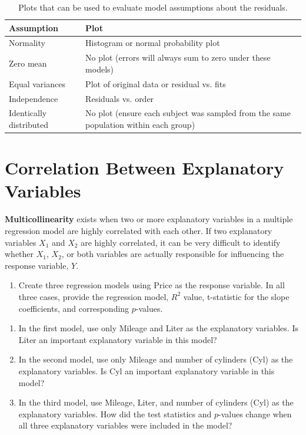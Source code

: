 \documentclass[
]{report}
\providecommand{\tightlist}{%
  \setlength{\itemsep}{0pt}\setlength{\parskip}{0pt}}
\begin{document}
\begin{table}[!h]
\centering
\caption{\label{tab:tab1}Plots that can be used to evaluate model assumptions about the residuals.}
\centering
\begin{tabular}[t]{ll}
\toprule
Assumption & Plot\\
\midrule
Normality & Histogram or normal probability plot\\
Zero mean & No plot (errors will always sum to zero under these models)\\
Equal variances & Plot of original data or residual vs. fits\\
Independence & Residuals vs. order\\
Identically distributed & No plot (ensure each subject was sampled from the same population within each group)\\
\bottomrule
\end{tabular}
\end{table}

\hypertarget{correlation-between-explanatory-variables}{%
\section*{Correlation Between Explanatory Variables}\label{correlation-between-explanatory-variables}}

\textbf{Multicollinearity} exists when two or more explanatory variables in a multiple regression model are highly correlated with each other. If two explanatory variables \(X_1\) and \(X_2\) are highly correlated, it can be very difficult to identify whether \(X_1\), \(X_2\), or both variables are actually responsible for influencing the response variable, \(Y\).

\begin{enumerate}
\def\labelenumi{\arabic{enumi}.}
\setcounter{enumi}{13}
\tightlist
\item
  Create three regression models using Price as the response variable. In all three cases, provide the regression model, \(R^2\) value, t-statistic for the slope coefficients, and corresponding \(p\)-values.
\end{enumerate}

\begin{enumerate}
\def\labelenumi{\alph{enumi}.}
\tightlist
\item
  In the first model, use only Mileage and Liter as the explanatory variables. Is Liter an important explanatory variable in this model?
\item
  In the second model, use only Mileage and number of cylinders (Cyl) as the explanatory variables. Is Cyl an important explanatory variable in this model?
\item
  In the third model, use Mileage, Liter, and number of cylinders (Cyl) as the explanatory variables. How did the test statistics and \(p\)-values change when all three explanatory variables were included in the model?
\end{enumerate}
\end{document}
